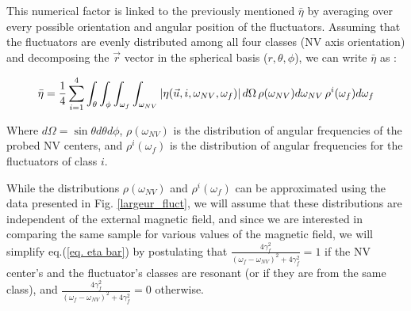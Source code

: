\documentclass[preprintnumbers,amsmath,amssymb,onecolumn,12pt]{revtex4-2}
\begin{document}
This numerical factor is linked to the previously mentioned $\bar \eta$ by averaging over every possible orientation and angular position of the fluctuators. Assuming that the fluctuators are evenly distributed among all four classes (NV axis orientation) and decomposing the $\vec r$ vector in the spherical basis ($r, \theta, \phi$), we can write $\bar \eta$ as :

\begin{equation}
\label{eq. eta bar}
\bar \eta =\frac{1}{4} \sum_{i=1}^4 \int_\theta \int_\phi  \int_{\omega_f} \int_{\omega_{NV}}   \abs{\eta(\vec u,i,\omega_{NV},\omega_f)}\, d\Omega\, \rho(\omega_{NV}) d\omega_{NV}\, \rho^i(\omega_f) d\omega_f 
\end{equation}

Where $d\Omega=\sin \theta d\theta d\phi$, $\rho(\omega_{NV})$ is the distribution of angular frequencies of the probed NV centers, and  $\rho^i(\omega_f)$ is the distribution of angular frequencies  for the fluctuators of class $i$.

While the distributions $\rho(\omega_{NV})$ and $\rho^i(\omega_f)$ can be approximated using the data presented in Fig. \ref{largeur_fluct}, we will assume that these distributions are independent of the external magnetic field, and since we are interested in comparing the same sample for various values of the magnetic field, we will simplify eq.(\ref{eq. eta bar}) by postulating that $\frac{4\gamma_f^2}{(\omega_f - \omega_{NV})^2+4\gamma_f^2} =1$ if the NV center's and the fluctuator's classes are resonant (or if they are from the same class), and $\frac{4\gamma_f^2}{(\omega_f - \omega_{NV})^2 +4\gamma_f^2}=0$ otherwise.
\end{document}

